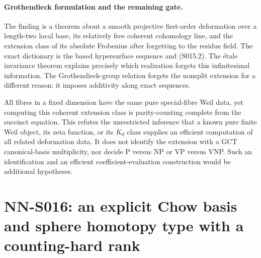 \paragraph{Grothendieck formulation and the remaining gate.}
The finding is a theorem about a smooth projective first-order
deformation over a length-two local base, its relatively free
coherent cohomology line, and the extension class of its absolute
Frobenius after forgetting to the residue field. The exact
dictionary is the based hypersurface sequence and (S015.2).
The \'etale invariance theorem explains precisely which realization
forgets this infinitesimal information. The Grothendieck-group
relation forgets the nonsplit extension for a different reason:
it imposes additivity along exact sequences.

All fibres in a fixed dimension have the same pure special-fibre
Weil data, yet computing this coherent extension class is
parity-counting complete from the succinct equation. This refutes
the unrestricted inference that a known pure finite Weil object,
its zeta function, or its $K_0$ class supplies an efficient
computation of all related deformation data. It does not identify
the extension with a GCT canonical-basis multiplicity, nor decide
P versus NP or VP versus VNP. Such an identification and an efficient
coefficient-evaluation construction would be additional hypotheses.


\section{NN-S016: an explicit Chow basis and sphere homotopy type with a counting-hard rank}

